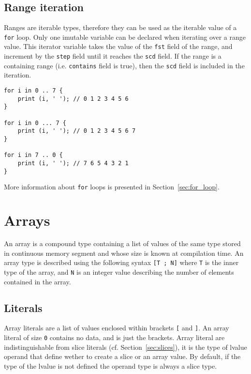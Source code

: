 \subsection {Range iteration}

Ranges are iterable types, therefore they can be used as the iterable value of a
\texttt{for} loop. Only one imutable variable can be declared when iterating
over a range value. This iterator variable takes the value of the \texttt{fst}
field of the range, and increment by the \texttt{step} field until it reaches
the \texttt{scd} field. If the range is a containing range (i.e.
\texttt{contains} field is true), then the \texttt{scd} field is included in the
iteration.

\begin{lstlisting}[style=coloredverbatim]
for i in 0 .. 7 {
    print (i, ' '); // 0 1 2 3 4 5 6
}

for i in 0 ... 7 {
    print (i, ' '); // 0 1 2 3 4 5 6 7
}

for i in 7 .. 0 {
    print (i, ' '); // 7 6 5 4 3 2 1
}
\end{lstlisting}

More information about \texttt{for} loops is presented in
Section~\ref{sec:for_loop}.

\section{Arrays}

An array is a compound type containing a list of values of the same type stored
in continuous memory segment and whose size is known at compilation time. An
array type is described using the following syntax \texttt{[T ; N]} where
\texttt{T} is the inner type of the array, and \texttt{N} is an integer value
describing the number of elements contained in the array.

\subsection {Literals}

Array literals are a list of values enclosed within brackets \texttt{[} and
  \texttt{]}. An array literal of size \texttt{0} contains no data, and is just
the brackets. Array literal are indistinguishable from slice literals (cf.
Section~\ref{sec:slices}), it is the type of lvalue operand that define wether
to create a slice or an array value. By default, if the type of the lvalue is
not defined the operand type is always a slice type.

